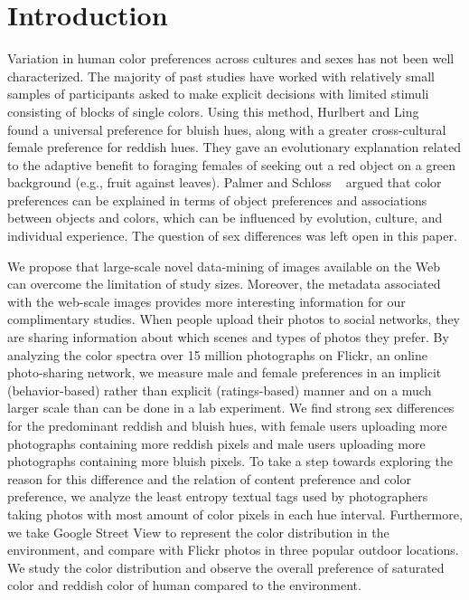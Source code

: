 \section{Introduction}
Variation in human color preferences across cultures and sexes has not been well characterized. The majority of past studies have worked with relatively small samples of participants asked to make explicit decisions with limited stimuli consisting of blocks of single colors. 
Using this method, Hurlbert and Ling ~\cite{hurlbert2007biological} found a universal preference for bluish hues, along with a greater cross-cultural female preference for reddish hues.
They gave an evolutionary explanation related to the adaptive benefit to foraging females of seeking out a red object on a green background (e.g., fruit against leaves).  
Palmer and Schloss ~\cite{palmer2010ecological} argued that color preferences can be explained in terms of object preferences and associations between objects and colors, which can be influenced by evolution, culture, and individual experience.  The question of sex differences was left open in this paper.

We propose that large-scale novel data-mining of images available on the Web can overcome the limitation of study sizes. Moreover, the metadata associated with the web-scale images provides more interesting information for our complimentary studies.
When people upload their photos to social networks, they are sharing information about which scenes and types of photos they prefer.
By analyzing the color spectra over 15 million photographs on Flickr, an online photo-sharing network, we measure male and female preferences in an implicit (behavior-based) rather than explicit (ratings-based) manner and on a much larger scale than can be done in a lab experiment.
We find strong sex differences for the predominant reddish and bluish hues, with female users uploading more photographs containing more reddish pixels and male users uploading more photographs containing more bluish pixels.
To take a step towards exploring the reason for this difference and the relation of content preference and color preference, we analyze the least entropy textual tags used by photographers taking photos with most amount of color pixels in each hue interval. Furthermore, we take Google Street View to represent the color distribution in the environment, and compare with Flickr photos in three popular outdoor locations. We study the color distribution and observe the overall preference of saturated color and reddish color of human compared to the environment.

